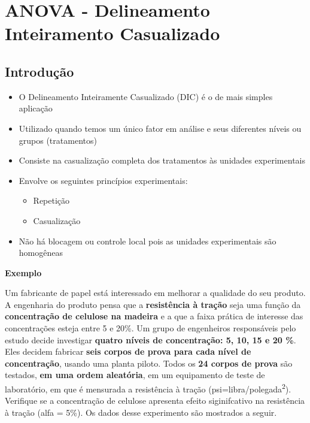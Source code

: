 \documentclass[
]{book}
\providecommand{\tightlist}{%
  \setlength{\itemsep}{0pt}\setlength{\parskip}{0pt}}
\begin{document}
\chapter{ANOVA - Delineamento Inteiramento Casualizado}\label{anova---delineamento-inteiramento-casualizado}

\section{Introdução}\label{introduuxe7uxe3o}

\begin{itemize}
\tightlist
\item
  O Delineamento Inteiramente Casualizado (DIC) é o de mais simples aplicação
\item
  Utilizado quando temos um único fator em análise e seus diferentes níveis ou grupos (tratamentos)
\item
  Consiste na casualização completa dos tratamentos às unidades experimentais
\item
  Envolve os seguintes princípios experimentais:

  \begin{itemize}
  \tightlist
  \item
    Repetição
  \item
    Casualização
  \end{itemize}
\item
  Não há blocagem ou controle local pois as unidades experimentais são homogêneas
\end{itemize}

\textbf{Exemplo}

Um fabricante de papel está interessado em melhorar a qualidade do seu produto. A engenharia do produto pensa que a \textbf{resistência à tração} seja uma função da \textbf{concentração de celulose na madeira} e a que a faixa prática de interesse das concentrações esteja entre 5 e 20\%. Um grupo de engenheiros responsáveis pelo estudo decide investigar \textbf{quatro níveis de concentração: 5, 10, 15 e 20 \%}. Eles decidem fabricar \textbf{seis corpos de prova para cada nível de concentração}, usando uma planta piloto. Todos os \textbf{24 corpos de prova} são testados, \textbf{em uma ordem aleatória}, em um equipamento de teste de laboratório, em que é mensurada a resistência à tração (psi=libra/polegada\textsuperscript{2}). Verifique se a concentração de celulose apresenta efeito siginifcativo na resistência à tração (alfa = 5\%). Os dados desse experimento são mostrados a seguir.
\end{document}
